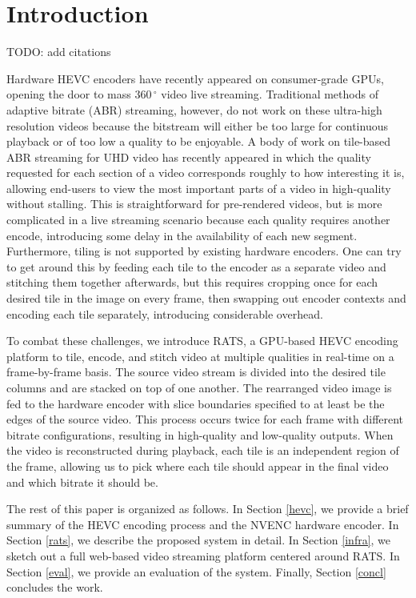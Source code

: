 
\section{Introduction} \label{intro}

TODO: add citations

Hardware HEVC encoders have recently appeared on consumer-grade GPUs, opening the door to mass $360\,^{\circ}$ video live streaming. Traditional methods of adaptive bitrate (ABR) streaming, however, do not work on these ultra-high resolution videos because the bitstream will either be too large for continuous playback or of too low a quality to be enjoyable. A body of work on tile-based ABR streaming for UHD video has recently appeared in which the quality requested for each section of a video corresponds roughly to how interesting it is, allowing end-users to view the most important parts of a video in high-quality without stalling. This is straightforward for pre-rendered videos, but is more complicated in a live streaming scenario because each quality requires another encode, introducing some delay in the availability of each new segment. Furthermore, tiling is not supported by existing hardware encoders. One can try to get around this by feeding each tile to the encoder as a separate video and stitching them together afterwards, but this requires cropping once for each desired tile in the image on every frame, then swapping out encoder contexts and encoding each tile separately, introducing considerable overhead.

To combat these challenges, we introduce RATS, a GPU-based HEVC encoding platform to tile, encode, and stitch video at multiple qualities in real-time on a frame-by-frame basis. The source video stream is divided into the desired tile columns and are stacked on top of one another. The rearranged video image is fed to the hardware encoder with slice boundaries specified to at least be the edges of the source video. This process occurs twice for each frame with different bitrate configurations, resulting in high-quality and low-quality outputs. When the video is reconstructed during playback, each tile is an independent region of the frame, allowing us to pick where each tile should appear in the final video and which bitrate it should be.

The rest of this paper is organized as follows. In Section \ref{hevc}, we provide a brief summary of the HEVC encoding process and the NVENC hardware encoder. In Section \ref{rats}, we describe the proposed system in detail. In Section \ref{infra}, we sketch out a full web-based video streaming platform centered around RATS. In Section \ref{eval}, we provide an evaluation of the system. Finally, Section \ref{concl} concludes the work.

